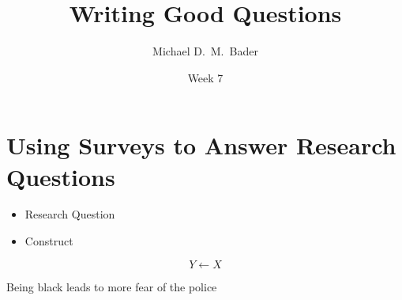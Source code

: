\documentclass[]{beamer}
\title{Writing Good Questions}
\author[Bader--SOCY 625]
{Michael D.~M.~Bader}
\institute 
{
  Practicum in Sociological Research (SOCY 625)
}
\date %
{Week 7}
\begin{document}
\begin{frame}
  \titlepage
\end{frame}

\section{Using Surveys to Answer Research Questions}

\begin{frame}
\begin{itemize}
\item Research Question
\item Construct
\end{itemize}
\end{frame}


\begin{frame}
\[Y \longleftarrow X\]
\end{frame}

\begin{frame}
\begin{figure}[h!]
\begin{center}
\end{center}
\end{figure}
\end{frame}

\begin{frame}
\begin{center}
\begin{figure}[h!]
\end{figure}
Being black leads to more fear of the police
\end{center}
\end{frame}
\end{document}
